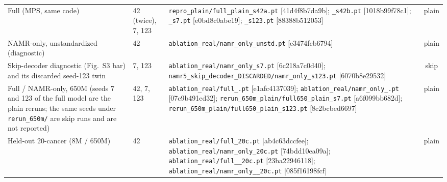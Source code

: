 \documentclass[11pt,a4paper]{article}
\begin{document}
\begin{table}[h]
{\begin{tabular}{@{}>{\raggedright\arraybackslash}p{}p{}p{}c@{}}
Full (MPS, same code) & 42 (twice), 7, 123 & \texttt{repro\_\allowbreak plain/full\_\allowbreak plain\_\allowbreak s42a.\allowbreak pt} [41d4f8b7da9b]; \texttt{\_s42b.pt} [1018b99f78c1]; \texttt{\_s7.pt} [e0bd8c0abe19]; \texttt{\_s123.pt} [88388b512053] & plain \\
NAMR-only, unstandardized (diagnostic) & 42 & \texttt{ablation\_\allowbreak real/namr\_\allowbreak only\_\allowbreak unstd.\allowbreak pt} [e3474fcb6794] & plain \\
Skip-decoder diagnostic (Fig.~S3 bar) and its discarded seed-123 twin & 7, 123 & \texttt{ablation\_\allowbreak real/namr\_\allowbreak only\_\allowbreak s7.\allowbreak pt} [6c218a7c0d40]; \texttt{namr5\_\allowbreak skip\_\allowbreak decoder\_\allowbreak DISCARDED/namr\_\allowbreak only\_\allowbreak s123.\allowbreak pt} [6070b8e29532] & skip \\
Full / NAMR-only, 650M (seeds 7 and 123 of the full model are the plain reruns; the same seeds under \texttt{rerun\_\allowbreak 650m/} are skip runs and are not reported) & 42, 7, 123 & \texttt{ablation\_\allowbreak real/full\_\allowbreak 650.\allowbreak pt} [e1afc4137039]; \texttt{ablation\_\allowbreak real/namr\_\allowbreak only\_\allowbreak 650.\allowbreak pt} [07c9b491ed32]; \texttt{rerun\_\allowbreak 650m\_\allowbreak plain/full650\_\allowbreak plain\_\allowbreak s7.\allowbreak pt} [a6f099bb682d]; \texttt{rerun\_\allowbreak 650m\_\allowbreak plain/full650\_\allowbreak plain\_\allowbreak s123.\allowbreak pt} [8c2bcbed6697] & plain \\
Held-out 20-cancer (8M / 650M) & 42 & \texttt{ablation\_\allowbreak real/full\_\allowbreak 20c.\allowbreak pt} [ab4c63dccfee]; \texttt{ablation\_\allowbreak real/namr\_\allowbreak only\_\allowbreak 20c.\allowbreak pt} [74bdd10ea09a]; \texttt{ablation\_\allowbreak real/full\_\allowbreak 650\_\allowbreak 20c.\allowbreak pt} [23ba22946118]; \texttt{ablation\_\allowbreak real/namr\_\allowbreak only\_\allowbreak 650\_\allowbreak 20c.\allowbreak pt} [085f16198fcf] & plain \\
\bottomrule
\end{tabular}}
\end{table}

\FloatBarrier
\end{document}

